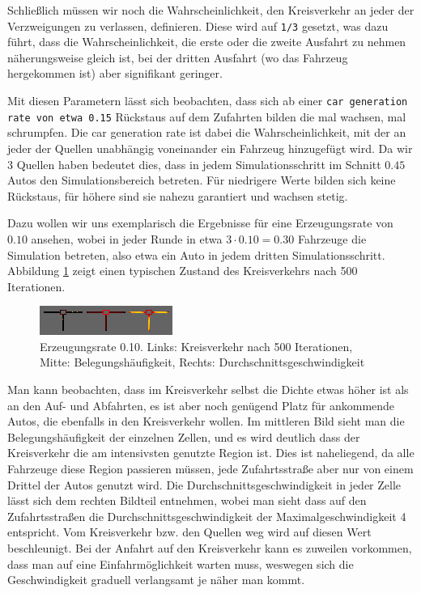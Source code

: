 \documentclass[11pt, a4paper]{article}
\begin{document}
Schließlich müssen wir noch die Wahrscheinlichkeit, den Kreisverkehr an jeder der Verzweigungen zu verlassen, definieren. Diese wird auf \texttt{1/3} gesetzt, was dazu führt, dass die Wahrscheinlichkeit, die erste oder die zweite Ausfahrt zu nehmen näherungsweise gleich ist, bei der dritten Ausfahrt (wo das Fahrzeug hergekommen ist) aber signifikant geringer.

Mit diesen Parametern lässt sich beobachten, dass sich ab einer \texttt{car generation rate von etwa 0.15} Rückstaus auf dem Zufahrten bilden die mal wachsen, mal schrumpfen. Die car generation rate ist dabei die Wahrscheinlichkeit, mit der an jeder der Quellen unabhängig voneinander ein Fahrzeug hinzugefügt wird. Da wir 3 Quellen haben bedeutet dies, dass in jedem Simulationsschritt im Schnitt $0.45$ Autos den Simulationsbereich betreten. Für niedrigere Werte bilden sich keine Rückstaus, für höhere sind sie nahezu garantiert und wachsen stetig.

Dazu wollen wir uns exemplarisch die Ergebnisse für eine Erzeugungsrate von $0.10$ ansehen, wobei in jeder Runde in etwa $3 \cdot 0.10 = 0.30$ Fahrzeuge die Simulation betreten, also etwa ein Auto in jedem dritten Simulationsschritt. Abbildung \ref{fig:roundabout010} zeigt einen typischen Zustand des Kreisverkehrs nach 500 Iterationen.

\begin{figure}[h!]
	\centering
	\includegraphics[width=\textwidth]{img/roundabout_010}
	\caption{Erzeugungsrate 0.10. Links: Kreisverkehr nach 500 Iterationen, Mitte: Belegungshäufigkeit, Rechts: Durchschnittsgeschwindigkeit}
	\label{fig:roundabout010}
\end{figure}

Man kann beobachten, dass im Kreisverkehr selbst die Dichte etwas höher ist als an den Auf- und Abfahrten, es ist aber noch genügend Platz für ankommende Autos, die ebenfalls in den Kreisverkehr wollen. Im mittleren Bild sieht man die Belegungshäufigkeit der einzelnen Zellen, und es wird deutlich dass der Kreisverkehr die am intensivsten genutzte Region ist. Dies ist naheliegend, da alle Fahrzeuge diese Region passieren müssen, jede Zufahrtsstraße aber nur von einem Drittel der Autos genutzt wird. Die Durchschnittsgeschwindigkeit in jeder Zelle lässt sich dem rechten Bildteil entnehmen, wobei man sieht dass auf den Zufahrtsstraßen die Durchschnittsgeschwindigkeit der Maximalgeschwindigkeit 4 entspricht. Vom Kreisverkehr bzw. den Quellen weg wird auf diesen Wert beschleunigt. Bei der Anfahrt auf den Kreisverkehr kann es zuweilen vorkommen, dass man auf eine Einfahrmöglichkeit warten muss, weswegen sich die Geschwindigkeit graduell verlangsamt je näher man kommt.
\end{document}
